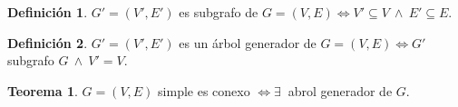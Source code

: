 \documentclass[10pt,a4paper]{article}
\theoremstyle{definition}
\newtheorem{definition}{Definición}[section]
\newtheorem{theorem}{Teorema}[section]
\begin{document}
\begin{definition}
	$G'=(V',E')$ es subgrafo de $G=(V,E) \iff V'\subseteq V\:\land\:E'\subseteq E$.
\end{definition}
\begin{definition}
	$G'=(V',E')$ es un árbol generador de $G=(V,E)\iff G'$ subgrafo $G\:\land\:V'=V$.
\end{definition}
\begin{theorem}
	$G=(V,E)$ simple es conexo $\iff \exists\:$ abrol generador de $G$.
\end{theorem}
\end{document}
